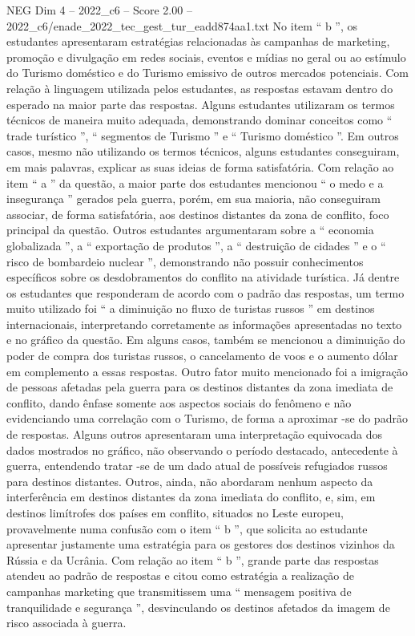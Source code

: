 \begin{textsample}{NEG Dim 4 – 2022\_c6 – Score 2.00 – 2022\_c6/enade\_2022\_tec\_gest\_tur\_eadd874aa1.txt}
No item “ b ”, os estudantes apresentaram estratégias relacionadas às campanhas de marketing, promoção e divulgação em redes sociais, eventos e mídias no geral ou ao estímulo do Turismo doméstico e do Turismo emissivo de outros mercados potenciais.
Com relação à linguagem utilizada pelos estudantes, as respostas estavam dentro do esperado na maior parte das respostas.
Alguns estudantes utilizaram os termos técnicos de maneira muito adequada, demonstrando dominar conceitos como “ trade turístico ”, “ segmentos de Turismo ” e “ Turismo doméstico ”.
Em outros casos, mesmo não utilizando os termos técnicos, alguns estudantes conseguiram, em mais palavras, explicar as suas ideias de forma satisfatória.
Com relação ao item “ a ” da questão, a maior parte dos estudantes mencionou “ o medo e a insegurança ” gerados pela guerra, porém, em sua maioria, não conseguiram associar, de forma satisfatória, aos destinos distantes da zona de conflito, foco principal da questão.
Outros estudantes argumentaram sobre a “ economia globalizada ”, a “ exportação de produtos ”, a “ destruição de cidades ” e o “ risco de bombardeio nuclear ”, demonstrando não possuir conhecimentos específicos sobre os desdobramentos do conflito na atividade turística.
Já dentre os estudantes que responderam de acordo com o padrão das respostas, um termo muito utilizado foi “ a diminuição no fluxo de turistas russos ” em destinos internacionais, interpretando corretamente as informações apresentadas no texto e no gráfico da questão.
Em alguns casos, também se mencionou a diminuição do poder de compra dos turistas russos, o cancelamento de voos e o aumento dólar em complemento a essas respostas.
Outro fator muito mencionado foi a imigração de pessoas afetadas pela guerra para os destinos distantes da zona imediata de conflito, dando ênfase somente aos aspectos sociais do fenômeno e não evidenciando uma correlação com o Turismo, de forma a aproximar -se do padrão de respostas.
Alguns outros apresentaram uma interpretação equivocada dos dados mostrados no gráfico, não observando o período destacado, antecedente à guerra, entendendo tratar -se de um dado atual de possíveis refugiados russos para destinos distantes.
Outros, ainda, não abordaram nenhum aspecto da interferência em destinos distantes da zona imediata do conflito, e, sim, em destinos limítrofes dos países em conflito, situados no Leste europeu, provavelmente numa confusão com o item “ b ”, que solicita ao estudante apresentar justamente uma estratégia para os gestores dos destinos vizinhos da Rússia e da Ucrânia.
Com relação ao item “ b ”, grande parte das respostas atendeu ao padrão de respostas e citou como estratégia a realização de campanhas marketing que transmitissem uma “ mensagem positiva de tranquilidade e segurança ”, desvinculando os destinos afetados da imagem de risco associada à guerra.

\end{textsample}

